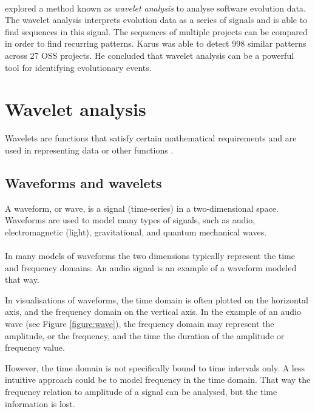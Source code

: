 \paragraph{}
\citet{karus2013} explored a method known as \emph{wavelet analysis }\rm to
analyse software evolution data. The wavelet analysis interprets evolution data
as a series of signals and is able to find sequences in this signal. The
sequences of multiple projects can be compared in order to find recurring
patterns. Karus was able to detect 998 similar patterns across 27 OSS projects.
He concluded that wavelet analysis can be a powerful tool for identifying
evolutionary events.





\section{Wavelet analysis}
\label{wavelet_analysis}
Wavelets are functions that satisfy certain mathematical requirements and are
used in representing data or other functions \cite{graps}.

\subsection{Waveforms and wavelets}
A waveform, or wave, is a signal (time-series) in a two-dimensional space.
Waveforms are used to model many types of signals, such as audio,
electromagnetic (light), gravitational, and quantum mechanical waves.

\paragraph{}
In many models of waveforms the two dimensions typically represent the time and
frequency domains. An audio signal is an example of a waveform modeled that way.

In visualisations of waveforms, the time domain is often plotted on the
horizontal axis, and the frequency domain on the vertical axis. In the example
of an audio wave (see Figure \ref{figure:wave}), the frequency domain may
represent the amplitude, or the frequency, and the time the duration of the
amplitude or frequency value.



However, the time domain is not specifically bound to time intervals only. A
less intuitive approach could be to model frequency in the time domain. That
way the frequency relation to amplitude of a signal can be analysed, but the
time information is lost.

